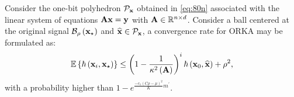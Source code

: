 \documentclass[12pt,draftcls,onecolumn]{IEEEtran}
\begin{document}
\begin{proposition}
\label{penaltyyy}
Consider the one-bit polyhedron $\mathcal{P}_{\mathbf{x}}$ obtained in \eqref{eq:80n} associated with the linear system of equations $\mathbf{A}\mathbf{x}=\mathbf{y}$ with $\mathbf{A}\in\mathbb{R}^{n\times d}$. %
Consider a ball centered at the original signal $\mathcal{B}_{\rho}\left(\mathbf{x}_{\star}\right)$ and $\widehat{\mathbf{x}}\in\mathcal{P}_{\mathbf{x}}$, a convergence rate for ORKA may be formulated as:
\begin{equation}
\label{bound2}
\begin{aligned}
\mathbb{E}\left\{\hbar\left(\mathbf{x}_{i},\mbx_{\star}\right)\right\} \leq \left(1-\frac{1}{\kappa^{2}\left(\mbA\right)}\right)^{i} \hbar\left(\mathbf{x}_{0},\widehat{\mathbf{x}}\right)+\rho^2,
\end{aligned}
\end{equation}\normalsize
with a probability higher than $1-e^{\frac{-c_1\left(C \rho-\mu\right)^{2}}{K}m^{\prime}}$.
\end{proposition}
\end{document}
